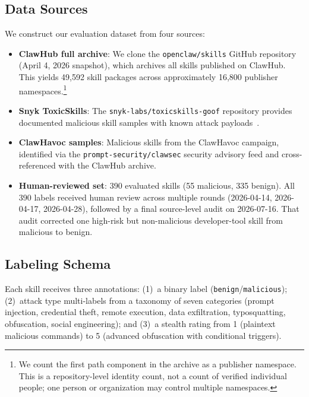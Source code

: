 \documentclass[sigconf,nonacm]{acmart}
\begin{document}
\subsection{Data Sources}

We construct our evaluation dataset from four sources:

\begin{itemize}
    \item \textbf{ClawHub full archive}: We clone the \texttt{openclaw/skills} GitHub repository (April 4, 2026 snapshot), which archives all skills published on ClawHub. This yields 49,592 skill packages across approximately 16,800 publisher namespaces.\footnote{We count the first path component in the archive as a publisher namespace. This is a repository-level identity count, not a count of verified individual people; one person or organization may control multiple namespaces.}

    \item \textbf{Snyk ToxicSkills}: The \texttt{snyk-labs/toxicskills-goof} repository provides documented malicious skill samples with known attack payloads~\cite{snyk2026toxicskills}.

    \item \textbf{ClawHavoc samples}: Malicious skills from the ClawHavoc campaign, identified via the \texttt{prompt-security/clawsec} security advisory feed and cross-referenced with the ClawHub archive.

    \item \textbf{Human-reviewed set}: 390 evaluated skills (55 malicious, 335 benign). All 390 labels received human review across multiple rounds (2026-04-14, 2026-04-17, 2026-04-28), followed by a final source-level audit on 2026-07-16. That audit corrected one high-risk but non-malicious developer-tool skill from malicious to benign.
\end{itemize}

\subsection{Labeling Schema}

Each skill receives three annotations: (1)~a binary label (\texttt{benign}/\texttt{malicious}); (2)~attack type multi-labels from a taxonomy of seven categories (prompt injection, credential theft, remote execution, data exfiltration, typosquatting, obfuscation, social engineering); and (3)~a stealth rating from 1 (plaintext malicious commands) to 5 (advanced obfuscation with conditional triggers).
\end{document}
